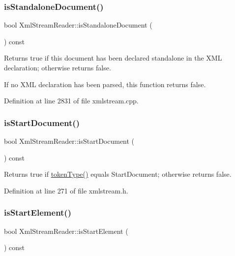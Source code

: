 \subsubsection{\texorpdfstring{is\+Standalone\+Document()}{isStandaloneDocument()}}
{\footnotesize\ttfamily bool Xml\+Stream\+Reader\+::is\+Standalone\+Document (\begin{DoxyParamCaption}{ }\end{DoxyParamCaption}) const}

Returns {\ttfamily true} if this document has been declared standalone in the X\+ML declaration; otherwise returns {\ttfamily false}.

If no X\+ML declaration has been parsed, this function returns {\ttfamily false}. 

Definition at line 2831 of file xmlstream.\+cpp.

\mbox{\label{class_xml_stream_reader_aa5a6f844839b4c7d893e3023f97feb4d}} 
\subsubsection{\texorpdfstring{is\+Start\+Document()}{isStartDocument()}}
{\footnotesize\ttfamily bool Xml\+Stream\+Reader\+::is\+Start\+Document (\begin{DoxyParamCaption}{ }\end{DoxyParamCaption}) const\hspace{0.3cm}{\ttfamily [inline]}}

Returns {\ttfamily true} if \hyperlink{class_xml_stream_reader_a2c26bfb63c27f2992e24f038d65c8c0a}{token\+Type()} equals  Start\+Document; otherwise returns {\ttfamily false}. 

Definition at line 271 of file xmlstream.\+h.

\mbox{\label{class_xml_stream_reader_a78cb57350cabab5e7ca7c1a8963a774d}} 
\subsubsection{\texorpdfstring{is\+Start\+Element()}{isStartElement()}}
{\footnotesize\ttfamily bool Xml\+Stream\+Reader\+::is\+Start\+Element (\begin{DoxyParamCaption}{ }\end{DoxyParamCaption}) const\hspace{0.3cm}{\ttfamily [inline]}}

